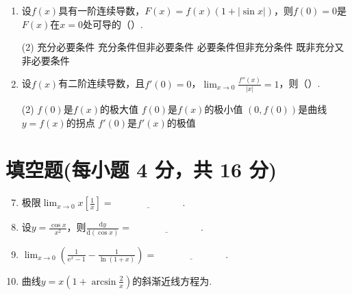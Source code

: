 \documentclass[../Main.tex]{subfiles}
\begin{document}
\begin{enumerate}
          \begin{tasks}[label=\textbf{\Alph*.}, label-width=1.5em, column-sep=1em](2)
              \task $-2f'(0)$
              \task $-f'(0)$
              \task $f'(0)$
              \task $0$
          \end{tasks}

    \item 设$f(x)$具有一阶连续导数，$F(x)=f(x)\left(1+|\sin x|\right)$，则$f(0)=0$是$F
              (x)$在$x=0$处可导的（\qquad）.

          \begin{tasks}[label=\textbf{\Alph*.}, label-width=1.5em, column-sep=1em](2)
              \task 充分必要条件
              \task 充分条件但非必要条件
              \task 必要条件但非充分条件
              \task 既非充分又非必要条件
          \end{tasks}

    \item 设$f(x)$有二阶连续导数，且$f'(0)=0$，$\lim_{x\to0}\frac{f''(x)}{|x|}=1$，则（\qquad）.

          \begin{tasks}[label=\textbf{\Alph*.}, label-width=1.5em, column-sep=1em](2)
              \task $f(0)$是$f(x)$的极大值
              \task $f(0)$是$f(x)$的极小值
              \task $\left(0,f(0)\right)$是曲线$y=f(x)$的拐点
              \task $f'(0)$是$f'(x)$的极值
          \end{tasks}
\end{enumerate}

\section{填空题(每小题 4 分，共 16 分)}
\begin{enumerate}
    \setcounter{enumi}{6}
    \item 极限$\lim_{x\to0}x\left[\frac{1}{x}\right]=\underline{\hspace{3cm}}$.

    \item 设$y=\frac{\cos x}{x^{2}}$，则$\frac{\mathrm{d}y}{\mathrm{d}(\cos
                  x)}=\underline{\hspace{3cm}}$.

    \item $\lim_{x\to0}\left(\frac{1}{\mathrm{e}^{x}-1}-\frac{1}{\ln(1+x)}\right
              )=\underline{\hspace{3cm}}$.

    \item 曲线$y=x\left(1+\arcsin\frac{2}{x}\right)$的斜渐近线方程为\underline{\hspace{3cm}}.
\end{enumerate}
\end{document}
